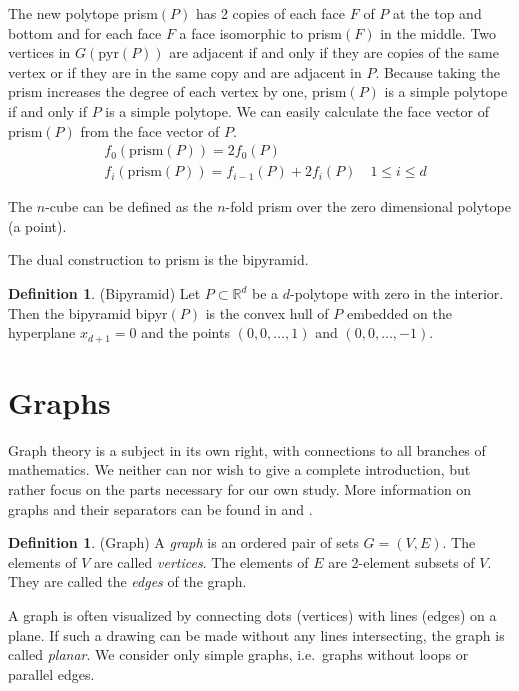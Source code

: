 \documentclass[a4paper,12pt]{book}
\theoremstyle{plain}
\theoremstyle{definition}
\newtheorem{definition}[theorem]{Definition}
\begin{document}
 The new polytope prism$(P)$ has 2 copies of 
each face $F$ of $P$ at the top and bottom and for each face $F$ a face isomorphic to 
prism$(F)$ in the middle. Two vertices in $G(\text{pyr}(P))$ are adjacent if and only if
they are copies of the same vertex or if they are in the same copy and are 
adjacent in $P$. Because taking the prism increases the degree of each vertex by one, prism$(P)$ 
is a simple polytope if and only if $P$ is a simple polytope. We can easily calculate
the face vector of prism$(P)$ from the face vector of $P$.
\begin{align}
& f_0(\textrm{prism}(P)) = 2f_0(P) \\
& f_i(\textrm{prism}(P)) = f_{i-1}(P) + 2f_i(P) \quad 1 \le i \le d
\end{align}


The $n$-cube can be defined as the $n$-fold 
prism over the zero dimensional polytope (a point). 

The dual construction to prism 
is the bipyramid. 
\begin{definition}
 (Bipyramid) Let $P\subset \mathbb{R}^d$ be a $d$-polytope with zero in the 
interior. Then the bipyramid bipyr$(P)$ is the convex hull of $P$ embedded on 
the hyperplane $x_{d+1} = 0$ and the points $(0,0,\dots, 1)$ and $(0,0,\dots, 
-1)$.
\end{definition}


\section{Graphs}

Graph theory is a subject in its own right, with connections to all branches 
of mathematics. We neither can nor wish to give a complete introduction, but
rather focus on the parts necessary for our own study. More information on graphs
and their separators can be found in \cite{spectra} and \cite{Diestel}.

\begin{definition}
(Graph) A \emph{graph} is an ordered pair of sets $G=(V,E)$. The elements of $V$ are called 
\emph{vertices}. The elements of $E$ are 2-element subsets of $V$. They are called 
the \emph{edges} of the graph. 
\end{definition}
A graph is often visualized by connecting dots (vertices) with lines (edges) on a plane. 
If such a drawing can be made without any lines intersecting, the graph is called
\emph{planar}.
We consider only simple graphs, i.e.\ graphs without loops or parallel 
edges.
\end{document}
